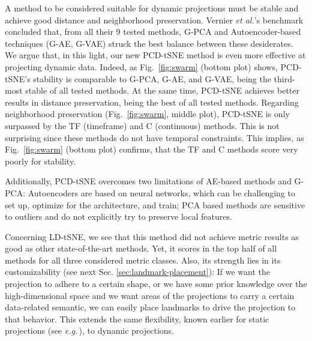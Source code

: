 A method to be considered suitable for dynamic projections must be stable and achieve good distance and neighborhood preservation. Vernier \emph{et al.}'s benchmark \cite{Vernier2020} concluded that, from all their 9 tested methods, G-PCA and Autoencoder-based techniques (G-AE, G-VAE) struck the best balance between these desiderates. We argue that, in this light, our new PCD-tSNE method is even more effective at projecting dynamic data. Indeed, as Fig.~\ref{fig:swarm} (bottom plot) shows, PCD-tSNE's stability is comparable to G-PCA, G-AE, and G-VAE, being the third-most stable of all tested methods. At the same time, PCD-tSNE achieves better results in distance preservation, being the best of all tested methods. Regarding neighborhood preservation (Fig.~\ref{fig:swarm}, middle plot), PCD-tSNE is only surpassed by the TF (timeframe) and C (continuous) methods. This is not surprising since these methods do not have temporal constraints. This implies, as Fig.~\ref{fig:swarm} (bottom plot) confirms, that the TF and C methods score very poorly for stability. 

Additionally, PCD-tSNE overcomes two limitations of AE-based methods and G-PCA: Autoencoders are based on neural networks, which can be challenging to set up, optimize for the architecture, and train; PCA based methods are sensitive to outliers and do not explicitly try to preserve local features.

Concerning LD-tSNE, we see that this method did not achieve metric results as good as other state-of-the-art methods. Yet, it scores in the top half of all methods for all three considered metric classes. Also, its strength lies in its customizability (see next Sec. \ref{sec:landmark-placement}): If we want the projection to adhere to a certain shape, or we have some prior knowledge over the high-dimensional space and we want areas of the projections to carry a certain data-related semantic, we can easily place landmarks to drive the projection to that behavior. This extends the same flexibility, known earlier for static projections (see \emph{e.g.}\,\cite{Joia2011,Pekalska1999}), to dynamic projections.

